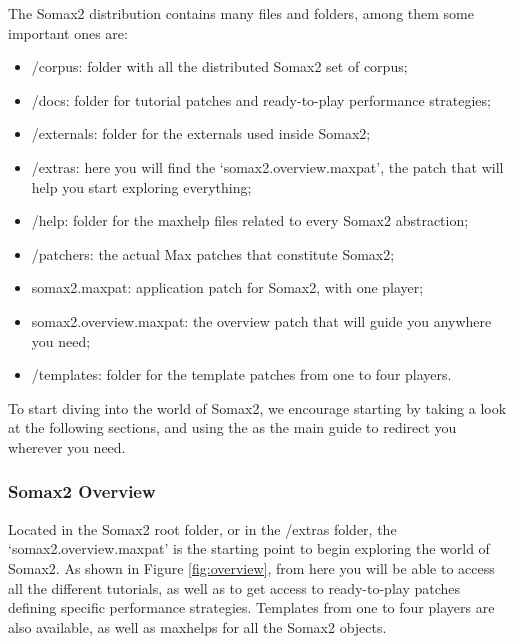 The Somax2 distribution contains many files and folders, among them some important ones are:

\begin{itemize}
    \item /corpus: folder with all the distributed Somax2 set of corpus;
    \item /docs: folder for tutorial patches and ready-to-play performance strategies;
    \item /externals: folder for the externals used inside Somax2;
    \item /extras: here you will find the `somax2.overview.maxpat', the patch that will help you start exploring everything;
    \item /help: folder for the maxhelp files related to every Somax2 abstraction;
    \item /patchers: the actual Max patches that constitute Somax2;
    \item somax2.maxpat: application patch for Somax2, with one player;
    \item somax2.overview.maxpat: the overview patch that will guide you anywhere you need;
    \item /templates: folder for the template patches from one to four players.
\end{itemize}

\noindent To start diving into the world of Somax2, we encourage starting by taking a look at the following sections, and using the  as the main guide to redirect you wherever you need.

\subsubsection{Somax2 Overview}

Located in the Somax2 root folder, or in the /extras folder, the `somax2.overview.maxpat' is the starting point to begin exploring the  world of Somax2. 
As shown in Figure \ref{fig:overview}, from here you will be able to access all the different tutorials, as well as to get access to ready-to-play patches defining specific performance strategies. Templates from one to four players are also available, as well as maxhelps for all the Somax2 objects.

